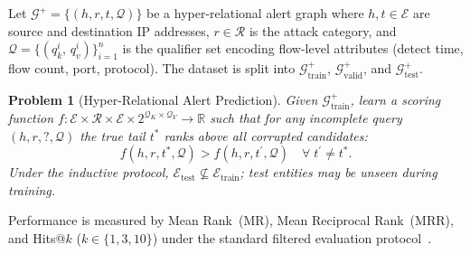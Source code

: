 \documentclass[10pt,journal,compsoc]{IEEEtran}
\newtheorem{problem}{Problem}
\begin{document}
Let $\mathcal{G}^{+} = \{(h, r, t, \mathcal{Q})\}$ be a
hyper-relational alert graph where $h, t \in \mathcal{E}$
are source and destination IP addresses,
$r \in \mathcal{R}$ is the attack category, and
$\mathcal{Q} = \{(q_k^i,\, q_v^i)\}_{i=1}^{n}$
is the qualifier set encoding flow-level attributes
(detect time, flow count, port, protocol).
The dataset is split into
$\mathcal{G}^{+}_{\mathrm{train}}$,
$\mathcal{G}^{+}_{\mathrm{valid}}$, and
$\mathcal{G}^{+}_{\mathrm{test}}$.

\begin{problem}[Hyper-Relational Alert Prediction]
\label{prob:hralert}
Given $\mathcal{G}^{+}_{\mathrm{train}}$, learn a scoring
function
$f : \mathcal{E} \times \mathcal{R} \times \mathcal{E}
     \times 2^{\mathcal{Q}_K \times \mathcal{Q}_V}
     \rightarrow \mathbb{R}$
such that for any incomplete query $(h, r, ?, \mathcal{Q})$
the true tail $t^{*}$ ranks above all corrupted candidates:
\begin{equation}
  f(h, r, t^{*}, \mathcal{Q})
  > f(h, r, t^{\prime}, \mathcal{Q})
  \quad \forall\; t^{\prime} \neq t^{*}.
  \label{eq:ranking_obj}
\end{equation}
Under the \emph{inductive protocol},
$\mathcal{E}_{\mathrm{test}}
 \not\subseteq \mathcal{E}_{\mathrm{train}}$;
test entities may be unseen during training.
\end{problem}

Performance is measured by Mean Rank~(MR), Mean Reciprocal
Rank~(MRR), and Hits@$k$ ($k \in \{1,3,10\}$) under the
standard filtered evaluation
protocol~\cite{bordes2013translating}.
\end{document}

